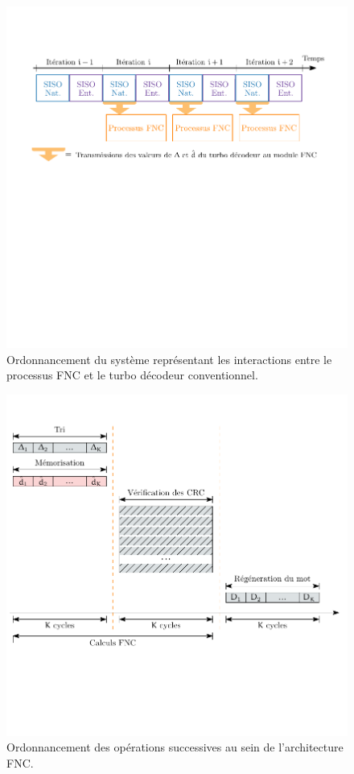 \begin{figure}[!t]
	\centering
	\includegraphics{main/ch4_fig/ipe/fnc_tc.pdf}
	\caption{Ordonnancement du système représentant les interactions entre le processus FNC et le turbo décodeur conventionnel. 
	\label{fig:fnc_tc}}
\end{figure}

\begin{figure}[!t]
	\centering
	\includegraphics{main/ch4_fig/ipe/fnc_schedul.pdf}
	\caption{Ordonnancement des opérations successives au sein de l'architecture FNC. \label{fig:fnc_schedul}}
\end{figure}

